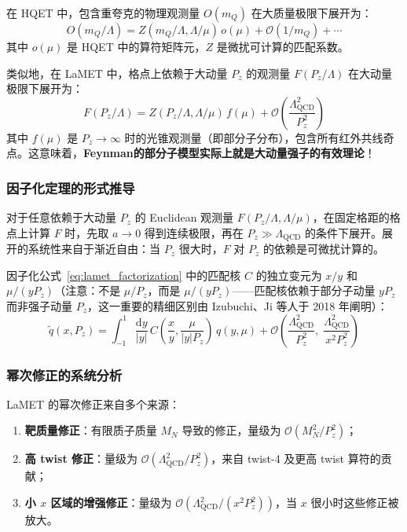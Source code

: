 \documentclass[11pt,a4paper]{ctexart}
\newcommand{\order}[1]{\mathcal{O}(#1)}
\begin{document}
在 HQET 中，包含重夸克的物理观测量 $O(m_Q)$ 在大质量极限下展开为：
\begin{equation}
O(m_Q/\Lambda) = Z(m_Q/\Lambda, \Lambda/\mu) \, o(\mu) + \order{1/m_Q} + \cdots
\end{equation}
其中 $o(\mu)$ 是 HQET 中的算符矩阵元，$Z$ 是微扰可计算的匹配系数。

类似地，在 LaMET 中，格点上依赖于大动量 $P_z$ 的观测量 $F(P_z/\Lambda)$ 在大动量极限下展开为：
\begin{equation}\label{eq:lamet_expansion}
F(P_z/\Lambda) = Z(P_z/\Lambda, \Lambda/\mu) \, f(\mu) + \order{\frac{\Lambda_{\text{QCD}}^{2}}{P_z^{2}}}
\end{equation}
其中 $f(\mu)$ 是 $P_z \to \infty$ 时的光锥观测量（即部分子分布），包含所有红外共线奇点。这意味着，\textbf{Feynman的部分子模型实际上就是大动量强子的有效理论}！

\subsubsection{因子化定理的形式推导}

对于任意依赖于大动量 $P_z$ 的 Euclidean 观测量 $F(P_z/\Lambda, \Lambda/\mu)$，在固定格距的格点上计算 $F$ 时，先取 $a \to 0$ 得到连续极限，再在 $P_z \gg \Lambda_{\text{QCD}}$ 的条件下展开。展开的系统性来自于渐近自由：当 $P_z$ 很大时，$F$ 对 $P_z$ 的依赖是可微扰计算的。

因子化公式~\eqref{eq:lamet_factorization} 中的匹配核 $C$ 的独立变元为 $x/y$ 和 $\mu/(yP_z)$（注意：不是 $\mu/P_z$，而是 $\mu/(yP_z)$——匹配核依赖于部分子动量 $yP_z$ 而非强子动量 $P_z$，这一重要的精细区别由 Izubuchi、Ji 等人于 2018 年阐明）：
\begin{equation}\label{eq:lamet_factorization_corrected}
\tilde{q}(x, P_z) = \int_{-1}^{1} \frac{\mathrm{d}y}{|y|} \,
C\!\left(\frac{x}{y}, \frac{\mu}{|y|P_z}\right) \,
q(y, \mu) + \order{\frac{\Lambda_{\text{QCD}}^{2}}{P_z^{2}},\;
\frac{\Lambda_{\text{QCD}}^{2}}{x^{2}P_z^{2}}}
\end{equation}

\subsubsection{幂次修正的系统分析}

LaMET 的幂次修正来自多个来源：

\begin{enumerate}
  \item \textbf{靶质量修正}：有限质子质量 $M_N$ 导致的修正，量级为 $\order{M_N^2/P_z^2}$；
  \item \textbf{高 twist 修正}：量级为 $\order{\Lambda_{\text{QCD}}^2/P_z^2}$，来自 twist-4 及更高 twist 算符的贡献；
  \item \textbf{小 $x$ 区域的增强修正}：量级为 $\order{\Lambda_{\text{QCD}}^2/(x^2 P_z^2)}$，当 $x$ 很小时这些修正被放大。
\end{enumerate}
\end{document}
